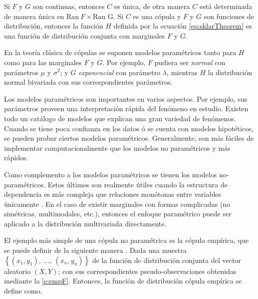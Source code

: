 Si \(F\) y \(G\) son continuas, entonces \(C\) es \'unica, de otra manera \(C\) est\'a determinada de manera \'unica en \(\mathrm{\text{Ran}}\ F \times \mathrm{\text{Ran}}\text{\ G}\). Si \(C\) es una c\'opula y \(F\) y \(G\) son funciones de distribuci\'on, entonces la funci\'on \(H\) definida por la ecuaci\'on \autoref{eq:sklarTheorem} es una funci\'on de distribuci\'on conjunta con marginales \(F\) y \(G\).

En la teor\'ia cl\'asica de c\'opulas se suponen modelos param\'etricos tanto para \(H\) como para las marginales \(F\) y \(G\). Por ejemplo, \(F\) pudiera ser \textit{normal} con par\'ametros \(\mu\) y \(\sigma^{2}\); y \(G\) \textit{exponencial} con par\'ametro \(\lambda\), mientras \(H\) la distribuci\'on normal bivariada con sus correspondientes par\'ametros.

Los modelos param\'etricos son importantes en varios aspectos.
Por ejemplo, sus par\'ametros proveen una interpretaci\'on r\'apida del fen\'omeno en estudio.
Existen todo un cat\'alogo de modelos \citep{nadarajah_compendium_2016} que explican una gran variedad de fen\'omenos.
Cuando se tiene poca confianza en los datos \'o se cuenta con modelos hipot\'eticos, se pueden probar ciertos modelos param\'etricos.
Generalmente, son m\'as f\'aciles de implementar computacionalmente que los modelos no param\'etricos y m\'as r\'apidos.

Como complemento a los modelos param\'etricos se tienen los modelos no-param\'etricos. Estos \'ultimos son realmente \'utiles cuando la estructura de dependencia es m\'as compleja que relaciones mon\'otonas entre variables \'unicamente \citep{joe_dependence_2014}. En el caso de existir marginales con formas complicadas (no sim\'etricas, multimodales, etc.), entonces el enfoque param\'etrico puede ser aplicado a la distribuci\'on multivariada directamente.

El ejemplo m\'as simple de una c\'opula no param\'etrica es la c\'opula emp\'irica, que se puede definir de la siguiente manera \citep{deheuvels_fonction_1979,fermanian_weak_2004,berghaus_weak_2017,radulovic_weak_2017,bucher_empirical_2011,carnicero_non-parametric_2013}.
Dada una muestra \(\left\{ \left( x_{1},y_{1} \right),\ \ldots,\ \left( x_{n},y_{n} \right) \right\}\) de la funci\'on de distribuci\'on conjunta del vector aleatorio \(\left( X,Y \right)\); con sus correspondientes pseudo-observaciones obtenidas mediante la \autoref{e:empF}.
Entonces, la funci\'on de distribuci\'on c\'opula emp\'irica se define como,

